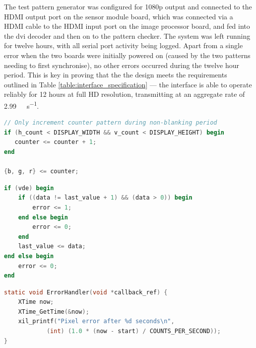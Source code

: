 The test pattern generator was configured for 1080p output and connected to the HDMI output port on the sensor module board, which was connected via a HDMI cable to the HDMI input port on the image processor board, and fed into the \gls{dvi} decoder and then on to the pattern checker. The system was left running for twelve hours, with all serial port activity being logged. Apart from a single error when the two boards were initially powered on (caused by the two patterns needing to first synchronise), no other errors occurred during the twelve hour period. This is key in proving that the the design meets the requirements outlined in Table \ref{table:interface_specification} --- the interface is able to operate reliably for 12 hours at full HD resolution, transmitting at an aggregate rate of \SI{2.99}{\giga\bit\per\second}.

\begin{lstlisting}[caption={Test pattern generator outputs an incrementing bit pattern.}, label={lst:test_pattern_generator}, language=Verilog]
// Only increment counter pattern during non-blanking period
if (h_count < DISPLAY_WIDTH && v_count < DISPLAY_HEIGHT) begin
   counter <= counter + 1;
end

{b, g, r} <= counter;
\end{lstlisting}

\begin{lstlisting}[caption={Test pattern checker ensures the received bit stream is the same as that sent.}, label={lst:pattern_checker}, language=Verilog]
if (vde) begin
    if ((data != last_value + 1) && (data > 0)) begin
        error <= 1;
    end else begin
        error <= 0;
    end
    last_value <= data;
end else begin
    error <= 0;
end
\end{lstlisting}

\begin{lstlisting}[caption={Interrupt handler for bit pattern error.}, label={lst:pattern_error}, language=C]
static void ErrorHandler(void *callback_ref) {
    XTime now;
    XTime_GetTime(&now);
    xil_printf("Pixel error after %d seconds\n",
            (int) (1.0 * (now - start) / COUNTS_PER_SECOND));
}
\end{lstlisting}


